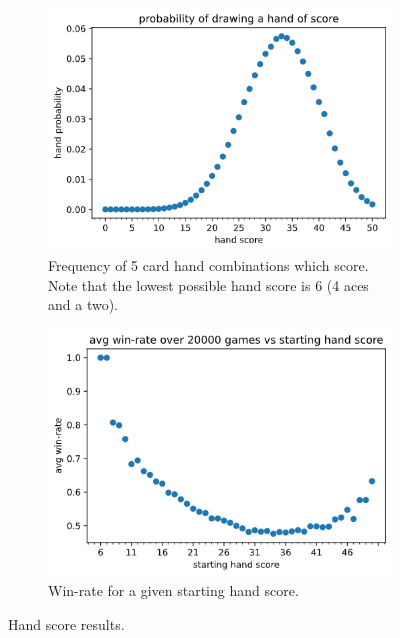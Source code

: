 \documentclass[../main.tex]{subfiles}
\begin{document}
\begin{figure}
    \centering
    \begin{subfigure}[t]{0.49\textwidth}
        \centering
        \includegraphics[width=\textwidth,keepaspectratio]{images/results/handscores.png}
        \caption{Frequency of 5 card hand combinations which score. Note that the lowest possible hand score is 6 (4 aces and a two).}
        \label{fig:startinghand-probs}
    \end{subfigure}
    \hfill
    \begin{subfigure}[t]{0.49\textwidth}
        \centering
        \includegraphics[width=\textwidth,keepaspectratio]{images/results/winrate_handscore.png}
        \caption{Win-rate for a given starting hand score.}
        \label{fig:startinghand-winrates}
    \end{subfigure}
    \caption{Hand score results.}
    \label{fig:handscores}
\end{figure}
\end{document}
